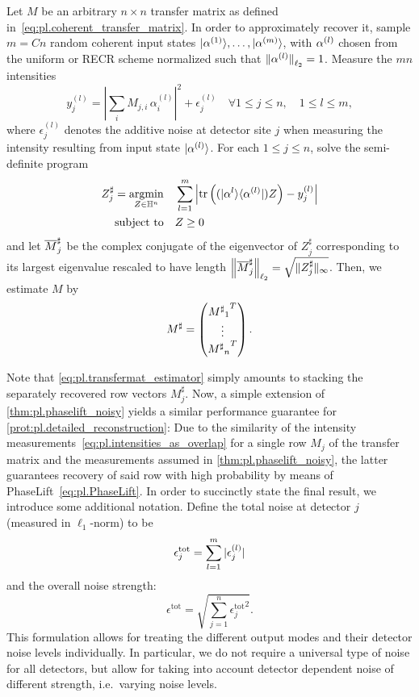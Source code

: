 \begin{protocol}%
  \label{prot:pl.detailed_reconstruction}
  Let ${M}$ be an arbitrary $n \times n$ transfer matrix as defined in~\eqref{eq:pl.coherent_transfer_matrix}.
  In order to approximately recover it, sample $m = Cn$ random coherent input states $\ket{{\alpha}^{(1)}},\ldots,\ket{{\alpha}^{(m)}}$, with $\alpha^{(l)}$ chosen from the uniform or RECR scheme normalized such that ${\Vert\alpha^{(l)}\Vert}_{\ell_2} = 1$.
  Measure the $mn$ intensities
  \[
    y_j^{(l)} = \left| \sum_i M_{j,i} \, \alpha_i^{(l)} \right|^2 + \epsilon_j^{(l)} \quad \forall 1 \leq j \leq n, \quad 1 \leq l \leq m,
  \]
  where $\epsilon_j^{(l)}$ denotes the additive noise at detector site $j$ when measuring the intensity resulting from input state  $\ket{{\alpha}^{(l)}}$.
  For each $1 \leq j \leq n$, solve the semi-definite program
  \begin{align}
    {Z}^\sharp_{j} = \underset{{Z} \in \mathbb{H}^n}{\operatorname{argmin}}& \quad \sum_{l=1}^m \left| \operatorname{tr} \left( (|{\alpha}^{l} \rangle \langle {\alpha}^{(l)} | )  Z \right) - y_j^{(l)} \right| \label{eq:tmat_recovery_program}\\
    \textrm{subject to} & \quad {Z} \geq 0 \nonumber
  \end{align}
  and let $\overline{M}_j^\sharp$ be the complex conjugate of the eigenvector of ${Z}^\sharp_{j}$ corresponding to its largest eigenvalue rescaled to have length ${\left\Vert\overline{M}_j^\sharp\right\Vert}_{\ell_2} = \sqrt{ \| {Z}^\sharp_{j} \|_\infty}$.
  Then, we estimate ${M}$ by
  \[
    {M}^\sharp =
    \begin{pmatrix}
      {{{M^\sharp}_1}^T} \\ \vdots \\  {{{M^\sharp}_n}^T}
    \end{pmatrix}.
    \label{eq:pl.transfermat_estimator}
  \]
\end{protocol}

Note that \cref{eq:pl.transfermat_estimator} simply amounts to stacking the separately recovered row vectors $ M_j^\sharp$.
Now, a simple extension of \cref{thm:pl.phaselift_noisy} yields a similar performance guarantee for \cref{prot:pl.detailed_reconstruction}:
Due to the similarity of the intensity measurements~\eqref{eq:pl.intensities_as_overlap} for a single row $M_j$ of the transfer matrix and the measurements assumed in \cref{thm:pl.phaselift_noisy}, the latter guarantees recovery of said row with high probability by means of PhaseLift~\eqref{eq:pl.PhaseLift}.
In order to succinctly state the final result, we introduce some additional notation.
Define the total noise at detector $j$ (measured in $\ell_1$-norm) to be
\[
  \epsilon_j^{\mathrm{tot}}= \sum_{l=1}^m {\vert\epsilon_j^{(l)}\vert}
  \label{eq:pl.error_term_summand}
\]
and the overall noise strength:
\[
  \epsilon^{\mathrm{tot}} = \sqrt{ \sum_{j=1}^n {\epsilon_j^{\mathrm{tot}}}^2}.
\]
This formulation allows for treating the different output modes and their detector noise levels individually.
In particular, we do not require a universal type of noise for all detectors, but allow for taking into account detector dependent noise of different strength, i.e.\ varying noise levels.

